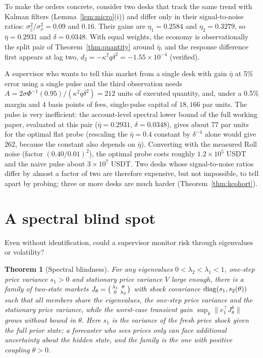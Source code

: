 \documentclass[12pt]{article}
\newtheorem{theorem}{Theorem}[section]
\theoremstyle{definition}
\theoremstyle{remark}
\begin{document}
To make the orders concrete, consider two desks that track the same trend with Kalman filters (Lemma~\ref{lem:micro}(i)) and differ only in their signal-to-noise ratios: $\sigma_\zeta^2/\sigma_\nu^2=0.09$ and $0.16$. Their gains are $\eta_1=0.2584$ and $\eta_2=0.3279$, so $\bar\eta=0.2931$ and $\delta=0.0348$. With equal weights, the economy is observationally the split pair of Theorem~\ref{thm:quantity} around $\bar\eta$, and the response difference first appears at lag two, $d_2=-\kappa^2q\delta^2=-1.55\times10^{-4}$ (verified).

A supervisor who wants to tell this market from a single desk with gain $\bar\eta$ at 5\% error using a single pulse and the third observation needs $A=2\sigma\Phi^{-1}(0.95)/(\kappa^2q\delta^2)=212$ units of executed quantity, and, under a 0.5\% margin and 4 basis points of fees, single-pulse capital of $18{,}166$ par units. The pulse is very inefficient: the account-level spectral lower bound of the full working paper, evaluated at this pair ($\bar\eta=0.2931$, $\delta=0.0348$), gives about 77 par units for the optimal flat probe (rescaling the $\bar\eta=0.4$ constant by $\delta^{-4}$ alone would give 262, because the constant also depends on $\bar\eta$). Converting with the measured Roll noise (factor $(0.40/0.01)^2$), the optimal probe costs roughly $1.2\times10^5$ USDT and the naive pulse about $3\times10^7$ USDT. Two desks whose signal-to-noise ratios differ by almost a factor of two are therefore expensive, but not impossible, to tell apart by probing; three or more desks are much harder (Theorem~\ref{thm:kcohort}).

\section{A spectral blind spot}\label{sec:blind}

Even without identification, could a supervisor monitor risk through eigenvalues or volatility?

\begin{theorem}[Spectral blindness]\label{thm:blind}
For any eigenvalues $0<\lambda_2<\lambda_1<1$, one-step price variance $s_1>0$ and stationary price variance $V$ large enough, there is a family of two-state markets $J_\theta=\begin{psmallmatrix}\lambda_1&\theta\\0&\lambda_2\end{psmallmatrix}$ with shock covariance ${\rm diag}(s_1,s_2(\theta))$ such that all members share the eigenvalues, the one-step price variance and the stationary price variance, while the worst-case transient gain $\sup_k\|e_1^\top J_\theta^k\|$ grows without bound in $\theta$. Here $s_1$ is the variance of the fresh price shock given the full prior state; a forecaster who sees prices only can face additional uncertainty about the hidden state, and the family is the one with positive coupling $\theta>0$.
\end{theorem}
\end{document}

